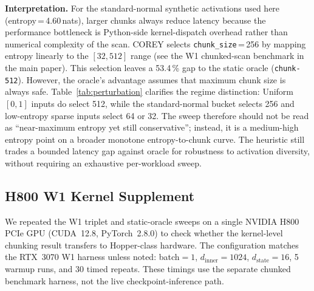 \noindent\textbf{Interpretation.}
For the standard-normal synthetic activations used here (entropy\,=\,4.60\,nats), larger chunks always reduce latency because the performance bottleneck is Python-side kernel-dispatch overhead rather than numerical complexity of the scan.
COREY selects \texttt{chunk\_size}\,=\,256 by mapping entropy linearly to the $[32, 512]$ range (see the W1 chunked-scan benchmark in the main paper).
This selection leaves a 53.4\,\% gap to the static oracle (\texttt{chunk-512}).
However, the oracle's advantage assumes that maximum chunk size is always safe. Table~\ref{tab:perturbation} clarifies the regime distinction: Uniform$[0,1]$ inputs do select 512, while the standard-normal bucket selects 256 and low-entropy sparse inputs select 64 or 32. The sweep therefore should not be read as ``near-maximum entropy yet still conservative''; instead, it is a medium-high entropy point on a broader monotone entropy-to-chunk curve. The heuristic still trades a bounded latency gap against oracle for robustness to activation diversity, without requiring an exhaustive per-workload sweep.

\subsection{H800 W1 Kernel Supplement}
\label{sec:h800_w1_kernel_supplement}

We repeated the W1 triplet and static-oracle sweeps on a single NVIDIA H800 PCIe GPU (CUDA~12.8, PyTorch~2.8.0) to check whether the kernel-level chunking result transfers to Hopper-class hardware. The configuration matches the RTX~3070 W1 harness unless noted: batch$=1$, $d_{\text{inner}}=1024$, $d_{\text{state}}=16$, 5 warmup runs, and 30 timed repeats. These timings use the separate chunked benchmark harness, not the live checkpoint-inference path.

\begin{table}[h]
\centering
\caption{H800 W1 kernel supplement. The COREY rows report the entropy-selected chunk-256 point from the triplet harness; Static-512 is the measured sweep oracle on the same hardware. This table strengthens the Hopper-class kernel evidence. The later runtime-chunk H800 closure in Appendix~\ref{sec:active_overhead} routes the selected chunk into the live checkpoint-inference scan path, but its end-to-end gain is small and scheduler-sensitive.}
\label{tab:h800_w1_supplement}
\small
{}
\end{table}

